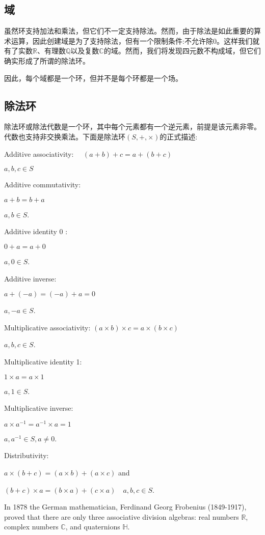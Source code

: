\subsection{域}
虽然环支持加法和乘法，但它们不一定支持除法。然而，由于除法是如此重要的算术运算，因此创建域是为了支持除法，但有一个限制条件:不允许除0。这样我们就有了实数$\mathbb{R}$、有理数$\mathbb{Q}$以及复数$\mathbb{C}$的域。然而，我们将发现四元数不构成域，但它们确实形成了所谓的除法环。

因此，每个域都是一个环，但并不是每个环都是一个场。

\subsection{除法环}
除法环或除法代数是一个环，其中每个元素都有一个逆元素，前提是该元素非零。代数也支持非交换乘法。下面是除法环$(S,+, \times)$的正式描述:

Additive associativity: $\quad(a+b)+c=a+(b+c)$

$a, b, c \in S$

Additive commutativity:

$a+b=b+a$

$a, b \in S$.

Additive identity 0 :

$0+a=a+0$

$a, 0 \in S$.

Additive inverse:

$a+(-a)=(-a)+a=0$

$a,-a \in S$.

Multiplicative associativity: $(a \times b) \times c=a \times(b \times c)$

$a, b, c \in S$.

Multiplicative identity 1:

$1 \times a=a \times 1$

$a, 1 \in S$.

Multiplicative inverse:

$a \times a^{-1}=a^{-1} \times a=1$

$a, a^{-1} \in S, a \neq 0$.

Distributivity:

$a \times(b+c)=(a \times b)+(a \times c)$ and

$(b+c) \times a=(b \times a)+(c \times a) \quad a, b, c \in S$.

In 1878 the German mathematician, Ferdinand Georg Frobenius (1849-1917), proved that there are only three associative division algebras: real numbers $\mathbb{R}$, complex numbers $\mathbb{C}$, and quaternions $\mathbb{H}$.


